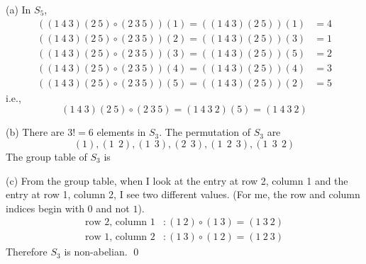 
(a) In $S_5$,
\begin{align*}
\left( (1 \ 4 \ 3)(2 \ 5) \circ (2 \ 3 \ 5) \right)(1) = \left( (1 \ 4 \ 3)(2 \ 5)\right)(1) &= 4 \\
\left( (1 \ 4 \ 3)(2 \ 5) \circ (2 \ 3 \ 5) \right)(2) = \left( (1 \ 4 \ 3)(2 \ 5)\right)(3) &= 1 \\
\left( (1 \ 4 \ 3)(2 \ 5) \circ (2 \ 3 \ 5) \right)(3) = \left( (1 \ 4 \ 3)(2 \ 5)\right)(5) &= 2 \\
\left( (1 \ 4 \ 3)(2 \ 5) \circ (2 \ 3 \ 5) \right)(4) = \left( (1 \ 4 \ 3)(2 \ 5)\right)(4) &= 3 \\
\left( (1 \ 4 \ 3)(2 \ 5) \circ (2 \ 3 \ 5) \right)(5) = \left( (1 \ 4 \ 3)(2 \ 5)\right)(2) &= 5 
\end{align*}
i.e.,
\[
(1 \ 4 \ 3)(2 \ 5) \circ (2 \ 3 \ 5) = (1 \ 4 \ 3 \ 2)(5) = (1 \ 4 \ 3 \ 2) 
\]

(b)
There are $3! = 6$ elements in $S_3$.
The permutation of $S_3$ are
\[
(1), (1 \ \ 2), (1 \ \ 3), (2 \ \ 3),
(1 \ \  2 \ \ 3),
(1 \ \  3 \ \ 2)
\]
The group table of $S_3$ is


(c) From the group table, when I look at the entry at row 2, column 1
and the entry at row 1, column 2, I see two different values.
(For me, the row and column indices begin with $0$ and not $1$).
\begin{align*}
\text{row 2, column 1} &: (1 \ 2) \circ (1 \ 3) = (1 \ 3 \ 2) \\
\text{row 1, column 2} &: (1 \ 3) \circ (1 \ 2) = (1 \ 2 \ 3) 
\end{align*}
Therefore $S_3$ is non-abelian.
\qed
